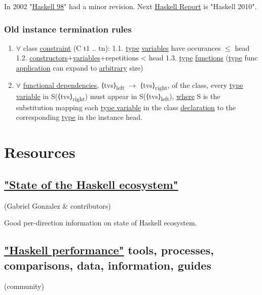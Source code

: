 \documentclass[a4paper,14pt,oneside]{book}
\begin{document}
In 2002 "\hyperref[orgf463d77]{Haskell 98}" had a minor revision. Next \hyperref[orgefa1b71]{Haskell Report} is "Haskell 2010".

\subsection{\label{org4364f88}Old instance termination rules}
\label{sec:org7756959}

\begin{enumerate}
\item \(\forall\) class \hyperref[org426d372]{constraint} (C t1 .. tn):
1.1. \hyperref[org1c12b47]{type} \hyperref[orgf7ed05f]{variables} have occurances \(\le\) head
1.2. \hyperref[org7deee75]{constructors}+\hyperref[orgf7ed05f]{variables}+repetitions < head
1.3. \textlnot{} \hyperref[org1c12b47]{type} \hyperref[orgdd54548]{functions} (\hyperref[org1c12b47]{type} func \hyperref[orgee00033]{application} can expand to \hyperref[orgc05b7af]{arbitrary} size)
\item \(\forall\) \hyperref[orgbfda133]{functional dependencies}, ⟨tvs⟩\textsubscript{left} \(\to\) ⟨tvs⟩\textsubscript{right}, of the class, every \hyperref[org5a11746]{type variable} in S(⟨tvs⟩\textsubscript{right}) must appear in S(⟨tvs⟩\textsubscript{left}), \hyperref[org7aa52a1]{where} S is the substitution mapping each \hyperref[org5a11746]{type variable} in the class \hyperref[org1fb737f]{declaration} to the corresponding \hyperref[org1c12b47]{type} in the instance head.
\end{enumerate}

\chapter{Resources}
\label{sec:orga6f209a}

\section{\href{https://github.com/Gabriel439/post-rfc/blob/master/sotu.md}{"State of the Haskell ecosystem"}}
\label{sec:orgdda7bcd}
(Gabriel Gonzalez \& contributors)

Good per-direction information on state of Haskell ecosystem.

\section{\href{https://github.com/haskell-perf}{"Haskell performance"} tools, processes, comparisons, data, information, guides}
\label{sec:org29b79b6}
(community)
\end{document}
